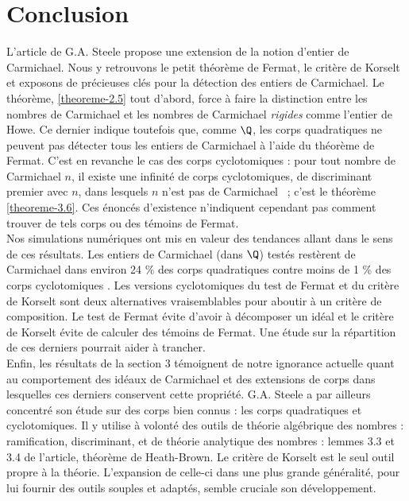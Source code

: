 \section*{Conclusion}

L'article de G.A. Steele propose une extension de la notion d'entier de Carmichael. Nous y retrouvons le petit théorème de Fermat, le critère de Korselt et exposons de précieuses clés pour la détection des entiers de Carmichael. Le théorème, \ref{theoreme-2.5} tout d'abord, force à faire la distinction entre les nombres de Carmichael et les nombres de Carmichael \emph{rigides} comme l'entier de Howe. Ce dernier indique toutefois que, comme $\Q$, les corps quadratiques ne peuvent pas détecter tous les entiers de Carmichael à l'aide du théorème de Fermat. C'est en revanche le cas des corps cyclotomiques : pour tout nombre de Carmichael $n$, il existe une infinité de corps cyclotomiques, de discriminant premier avec $n$, dans lesquels $n$ n'est pas de Carmichael ~; c'est le théorème \ref{theoreme-3.6}. Ces énoncés d'existence n'indiquent cependant pas comment trouver de tels corps ou des témoins de Fermat. \\

Nos simulations numériques ont mis en valeur des tendances allant dans le sens de ces résultats. Les entiers de Carmichael (dans $\Q$) testés restèrent de Carmichael dans environ 24 \% des corps quadratiques  contre moins de 1 \% des corps cyclotomiques . Les versions cyclotomiques du test de Fermat et du critère de Korselt sont deux alternatives vraisemblables pour aboutir à un critère de composition. Le test de Fermat évite d'avoir à décomposer un idéal et le critère de Korselt évite de calculer des témoins de Fermat. Une étude sur la répartition de ces derniers pourrait aider à trancher. \\

Enfin, les résultats de la section 3 témoignent de notre ignorance actuelle quant au comportement des idéaux de Carmichael et des extensions de corps dans lesquelles ces derniers conservent cette propriété. G.A. Steele a par ailleurs concentré son étude sur des corps bien connus : les corps quadratiques et cyclotomiques. Il y utilise à volonté des outils de théorie algébrique des nombres : ramification, discriminant, et de théorie analytique des nombres : lemmes 3.3 et 3.4 de l'article, théorème de Heath-Brown. Le critère de Korselt est le seul outil propre à la théorie. L'expansion de celle-ci dans une plus grande généralité, pour lui fournir des outils souples et adaptés, semble cruciale son développement.

